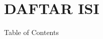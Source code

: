 \documentclass[main]{subfiles}
\begin{document}
\chapter*{DAFTAR ISI}
Table of Contents
\end{document}
